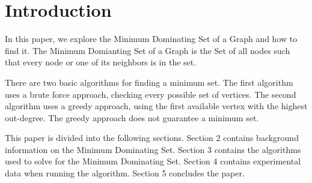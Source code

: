 \documentclass[paper.tex]{subfiles}
\begin{document}
\section{Introduction}

In this paper, we explore the Minimum Dominating Set of a Graph and how to find it.
The Minimum Domianting Set of a Graph is the Set of all nodes such that every node or one of its neighbors is in the set.

There are two basic algorithms for finding a minimum set.
The first algorithm uses a brute force approach, checking every possible set of vertices.
The second algorithm uses a greedy approach, using the first available vertex with the highest out-degree.
The greedy approach does not guarantee a minimum set.

This paper is divided into the following sections. 
Section 2 contains background information on the Minimum Dominating Set.
Section 3 contains the algorithms used to solve for the Minimum Dominating Set.
Section 4 contains experimental data when running the algorithm.
Section 5 concludes the paper.
\end{document}
